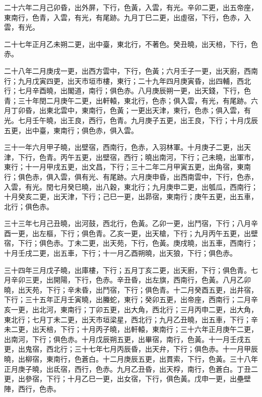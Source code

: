 \begin{pinyinscope}
二十六年二月己卯昏，出外屏，下行，色黃，入雲，有光。辛卯二更，出五帝座，東南行，色青，入雲，有光，有尾跡。九月丁巳二更，出虛宿，下行，色赤，入雲，有光。

二十七年正月乙未朔二更，出中臺，東北行，不著色。癸丑曉，出天棓，下行，色赤。

二十八年二月庚戌一更，出西方雲中，下行，色黃；六月壬子一更，出天廚，西南行；九月戊寅四更，出天市垣市樓，東行；二十九年四月庚寅昏，出四輔，西北行；七月辛酉曉，出閣道，南行；俱色赤。八月庚辰朔一更，出天錢，下行，色青；三十年閏二月庚午二更，出軒轅，東北行，色赤；俱入雲，有光，有尾跡。六月丁卯昏，出東北雲中，東南行，色黃；一更出天津，東行，色赤；俱入雲，有光。七月壬午曉，出王良，西行，色青。九月庚子五更，出王良，下行；十月戊辰五更，出中臺，東南行；俱色赤，俱入雲。

三十一年六月甲子曉，出壁宿，西南行，色赤，入羽林軍。十月庚子二更，出天津，下行，色青。丙午五更，出壁宿，西行；曉出南河，下行；己未曉，出軍市，東行；十一月甲戌五更，出文昌，下行；三十二年二月甲寅五更，出角宿，東南行；俱色赤，俱入雲，俱有光、有尾跡。六月庚申昏，出西南雲中，下行，色赤，入雲，有光。閏七月癸巳曉，出八穀，東北行；九月庚申二更，出瓠瓜，西南行；十月癸亥二更，出天津，下行；己巳一更，出昴宿，東南行；庚午五更，出五車，北行；俱色赤。

三十三年七月己丑曉，出河鼓，西北行，色黃。乙卯一更，出鬥宿，下行；八月辛酉一更，出左樞，下行；俱色青。乙亥一更，出天槍，下行；九月丙午五更，出壁宿，下行；俱色赤。丁未二更，出天苑，下行，色黃。庚戌曉，出五車，西南行；十月壬戌二更，出五車，下行；十一月乙酉朔曉，出天狼，下行；俱色赤。

三十四年三月戊子曉，出庫樓，下行；五月丁亥二更，出天廚，下行；俱色青。七月辛卯三更，出開陽，下行，色赤。辛丑昏，出左旗，西南行，色黃。八月乙卯曉，出天苑，下行；辛未昏，出鬥宿，下行；俱色青。十二月癸酉五更，出井宿，下行；三十五年正月壬寅曉，出螣蛇，東行；癸卯五更，出帝座，西南行；二月辛亥一更，出北河，東南行；丁卯五更，出大角，西北行；三月丙申二更，出大角，東北行；七月丁未二更，出天市垣梁星，西北行；九月乙丑曉，出五車，下行；辛未二更，出天棓，下行；十月丙子曉，出軒轅，東南行；三十六年正月庚午二更，出南河，下行；俱色赤。十月戊辰朔五更，出畢宿，南行，色黃。十一月壬戌五更，出鬼宿，西北行；三十七年七月丙辰昏，出天弁，下行；俱色赤。十一月甲辰曉，出柳宿，東南行，色蒼白。十二月庚辰五更，出貫索，下行，色黃。三十八年正月庚子曉，出氐宿，西行，色赤。九月乙丑昏，出天桴，南行，色蒼白。丁丑二更，出參宿，下行；十月乙巳一更，出女宿，下行，俱色黃。戊申一更，出壘壁陣，西行，色赤。


\end{pinyinscope}
